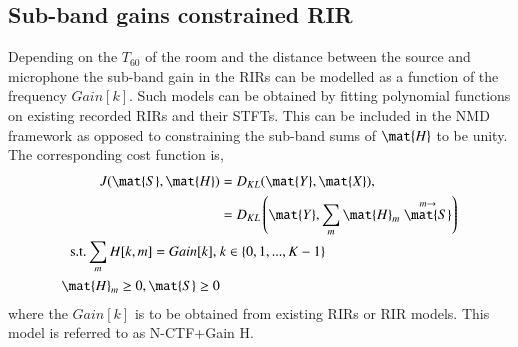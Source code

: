 \subsection{Sub-band gains constrained RIR}
\label{ssec:gain_RIR}
Depending on the $T_{60}$ of the room and the distance between the source and
microphone the sub-band gain in the RIRs can be modelled as a function of the
frequency $Gain[k]$. Such models can be obtained by fitting
polynomial functions on existing recorded RIRs and their STFTs. This can be
included in the NMD framework as opposed to constraining the sub-band sums of
$\mat{H}$ to be unity. The corresponding cost function is,   
\begin{align}
  J(\mat{S},\mat{H}) &= D_{KL}(\mat{Y}, \mat{X}),\\
  &= D_{KL}\left(\mat{Y}, \sum_{m} \mat{H}_m
  \stackrel{m\rightarrow}{\mat{S}}\right) \\
  \text{s.t.} \sum_m H[k,m] = Gain[k],\ & k\in\{0,1,...,K-1\}\\
  \mat{H}_m \ge 0, \mat{S} \ge 0
  \label{eqn:NMFD_NMFcost_prop2}
\end{align}
where the $Gain[k]$ is to be obtained from existing RIRs or RIR models. This model is referred to as N-CTF+Gain H. 

